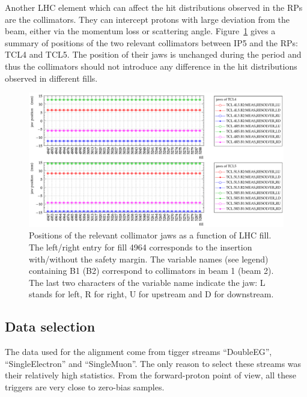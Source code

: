 \documentclass[TOTEM]{cern/cernphprep}
\begin{document}
Another LHC element which can affect the hit distributions observed in the RPs are the collimators. They can intercept protons with large deviation from the beam, either via the momentum loss or scattering angle. Figure~\ref{fig:cond_collimators} gives a summary of positions of the two relevant collimators between IP5 and the RPs: TCL4 and TCL5. The position of their jaws is unchanged during the period and thus the collimators should not introduce any difference in the hit distributions observed in different fills.

\begin{figure}[h!]
\begin{center}
\includegraphics[width=1\hsize]{fig/conditions/collimator_positions_resolver.pdf}
\caption{%
Positions of the relevant collimator jaws as a function of LHC fill. The left/right entry for fill 4964 corresponds to the insertion with/without the safety margin. The variable names (see legend) containing B1 (B2) correspond to collimators in beam 1 (beam 2). The last two characters of the variable name indicate the jaw: L stands for left, R for right, U for upstream and D for downstream.
}
\label{fig:cond_collimators}
\end{center}
\end{figure}




\newpage

\subsection{Data selection}
\label{s:phys-data_selection}

The data used for the alignment come from tigger streams ``DoubleEG'', ``SingleElectron'' and ``SingleMuon''. The only reason to select these streams was their relatively high statistics. From the forward-proton point of view, all these triggers are very close to zero-bias samples.
\end{document}
